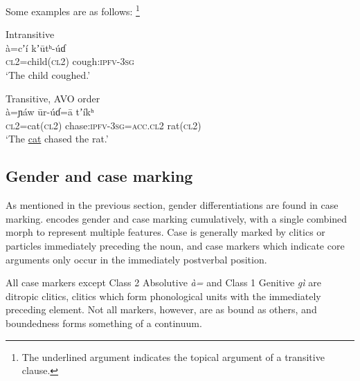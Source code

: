 \documentclass[output=collectionpaper,hidelinks]{langscibook}
\theoremstyle{remark}
\begin{document}
Some examples are as follows:%
\footnote{The underlined argument indicates the
topical argument of a transitive clause.}

\ea
Intransitive \\
\gll à=cʼí kʼūtʰ-úɗ \\
 \textsc{cl2}=child(\textsc{cl2}) cough:\textsc{ipfv}-\textsc{3sg} \\
\glt `The child coughed.' \\
\z

\ea
 Transitive, AVO order \\
 \gll à=ɲáw ūr-úɗ=ā tʼíkʰ \\
 \textsc{cl2}=cat(\textsc{cl2}) chase:\textsc{ipfv}-\textsc{3sg}=\textsc{acc.cl2} rat(\textsc{cl2}) \\
\glt `The \uline{cat} chased the rat.' \\
\z

%


\subsection{Gender and case marking}
\label{sec:Don:Case_Marking}

As mentioned in the previous section, gender differentiations are found in case
marking.  encodes gender and case marking cumulatively, with a single
combined morph to represent multiple features. Case is generally marked by
\mbox{clitics} or particles immediately preceding the noun, and case markers which
indicate core arguments only occur in the immediately postverbal position.

All case markers except Class 2 Absolutive \emph{à=} and Class 1 Genitive
\emph{gì} are ditropic clitics, clitics which form phonological units with the
immediately preceding element. Not all markers, however, are as bound as
others, and boundedness forms something of a continuum.
\end{document}
